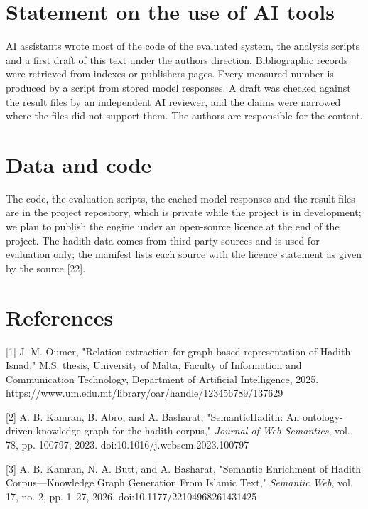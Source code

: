 \documentclass[
  english,
]{article}
\begin{document}
\section{Statement on the use of AI
tools}\label{statement-on-the-use-of-ai-tools}

AI assistants wrote most of the code of the evaluated system, the
analysis scripts and a first draft of this text under the
authors\textquotesingle{} direction. Bibliographic records were
retrieved from indexes or publishers\textquotesingle{} pages. Every
measured number is produced by a script from stored model responses. A
draft was checked against the result files by an independent AI
reviewer, and the claims were narrowed where the files did not support
them. The authors are responsible for the content.

\section{Data and code}\label{data-and-code}

The code, the evaluation scripts, the cached model responses and the
result files are in the project repository, which is private while the
project is in development; we plan to publish the engine under an
open-source licence at the end of the project. The hadith data comes
from third-party sources and is used for evaluation only; the manifest
lists each source with the licence statement as given by the source
{[}22{]}.

\section{References}\label{references}

{[}1{]} J. M. Oumer, "Relation extraction for graph-based representation
of Hadith Isnad," M.S. thesis, University of Malta, Faculty of
Information and Communication Technology, Department of Artificial
Intelligence, 2025.
https://www.um.edu.mt/library/oar/handle/123456789/137629

{[}2{]} A. B. Kamran, B. Abro, and A. Basharat, "SemanticHadith: An
ontology-driven knowledge graph for the hadith corpus," \emph{Journal of
Web Semantics}, vol. 78, pp. 100797, 2023.
doi:10.1016/j.websem.2023.100797

{[}3{]} A. B. Kamran, N. A. Butt, and A. Basharat, "Semantic Enrichment
of Hadith Corpus---Knowledge Graph Generation From Islamic Text,"
\emph{Semantic Web}, vol. 17, no. 2, pp. 1--27, 2026.
doi:10.1177/22104968261431425
\end{document}
